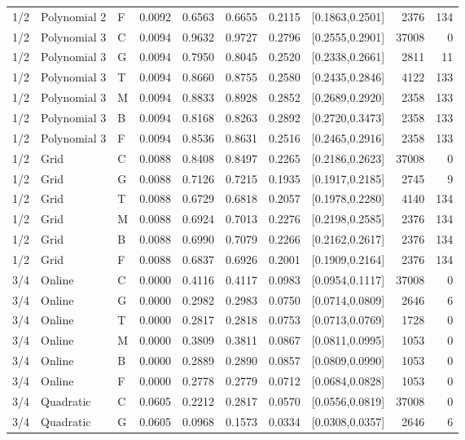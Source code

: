 \begin{longtable}{lllrrrrlrr}
1/2 & Polynomial 2 & F & 0.0092 & 0.6563 & 0.6655 & 0.2115 & [0.1863,0.2501] & 2376 & 134 \\
1/2 & Polynomial 3 & C & 0.0094 & 0.9632 & 0.9727 & 0.2796 & [0.2555,0.2901] & 37008 & 0 \\
1/2 & Polynomial 3 & G & 0.0094 & 0.7950 & 0.8045 & 0.2520 & [0.2338,0.2661] & 2811 & 11 \\
1/2 & Polynomial 3 & T & 0.0094 & 0.8660 & 0.8755 & 0.2580 & [0.2435,0.2846] & 4122 & 133 \\
1/2 & Polynomial 3 & M & 0.0094 & 0.8833 & 0.8928 & 0.2852 & [0.2689,0.2920] & 2358 & 133 \\
1/2 & Polynomial 3 & B & 0.0094 & 0.8168 & 0.8263 & 0.2892 & [0.2720,0.3473] & 2358 & 133 \\
1/2 & Polynomial 3 & F & 0.0094 & 0.8536 & 0.8631 & 0.2516 & [0.2465,0.2916] & 2358 & 133 \\
1/2 & Grid & C & 0.0088 & 0.8408 & 0.8497 & 0.2265 & [0.2186,0.2623] & 37008 & 0 \\
1/2 & Grid & G & 0.0088 & 0.7126 & 0.7215 & 0.1935 & [0.1917,0.2185] & 2745 & 9 \\
1/2 & Grid & T & 0.0088 & 0.6729 & 0.6818 & 0.2057 & [0.1978,0.2280] & 4140 & 134 \\
1/2 & Grid & M & 0.0088 & 0.6924 & 0.7013 & 0.2276 & [0.2198,0.2585] & 2376 & 134 \\
1/2 & Grid & B & 0.0088 & 0.6990 & 0.7079 & 0.2266 & [0.2162,0.2617] & 2376 & 134 \\
1/2 & Grid & F & 0.0088 & 0.6837 & 0.6926 & 0.2001 & [0.1909,0.2164] & 2376 & 134 \\
3/4 & Online & C & 0.0000 & 0.4116 & 0.4117 & 0.0983 & [0.0954,0.1117] & 37008 & 0 \\
3/4 & Online & G & 0.0000 & 0.2982 & 0.2983 & 0.0750 & [0.0714,0.0809] & 2646 & 6 \\
3/4 & Online & T & 0.0000 & 0.2817 & 0.2818 & 0.0753 & [0.0713,0.0769] & 1728 & 0 \\
3/4 & Online & M & 0.0000 & 0.3809 & 0.3811 & 0.0867 & [0.0811,0.0995] & 1053 & 0 \\
3/4 & Online & B & 0.0000 & 0.2889 & 0.2890 & 0.0857 & [0.0809,0.0990] & 1053 & 0 \\
3/4 & Online & F & 0.0000 & 0.2778 & 0.2779 & 0.0712 & [0.0684,0.0828] & 1053 & 0 \\
3/4 & Quadratic & C & 0.0605 & 0.2212 & 0.2817 & 0.0570 & [0.0556,0.0819] & 37008 & 0 \\
3/4 & Quadratic & G & 0.0605 & 0.0968 & 0.1573 & 0.0334 & [0.0308,0.0357] & 2646 & 6 \\

\end{longtable}
